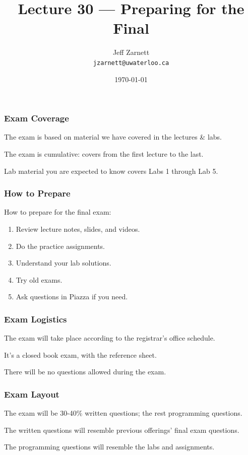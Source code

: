 

\title{Lecture 30 --- Preparing for the Final }

\author{Jeff Zarnett \\ \small \texttt{jzarnett@uwaterloo.ca}}
\date{\today}




\begin{frame}
  \titlepage

\end{frame}

\begin{frame}
\frametitle{Exam Coverage}

The exam is based on material we have covered in the lectures \& labs.

The exam is cumulative: covers from the first lecture to the last.

Lab material you are expected to know covers Labs 1 through Lab 5.

\end{frame}

\begin{frame}
\frametitle{How to Prepare}

How to prepare for the final exam:

\begin{enumerate}
	\item Review lecture notes, slides, and videos.
	\item Do the practice assignments.
	\item Understand your lab solutions.
	\item Try old exams.
	\item Ask questions in Piazza if you need.
\end{enumerate}

\end{frame}


\begin{frame}
\frametitle{Exam Logistics}

The exam will take place according to the registrar's office schedule.

It's a closed book exam, with the reference sheet.

There will be no questions allowed during the exam.

\end{frame}


\begin{frame}
\frametitle{Exam Layout}

The exam will be 30-40\% written questions; the rest programming questions.

The written questions will resemble previous offerings' final exam questions.

The programming questions will resemble the labs and assignments.

\end{frame}


